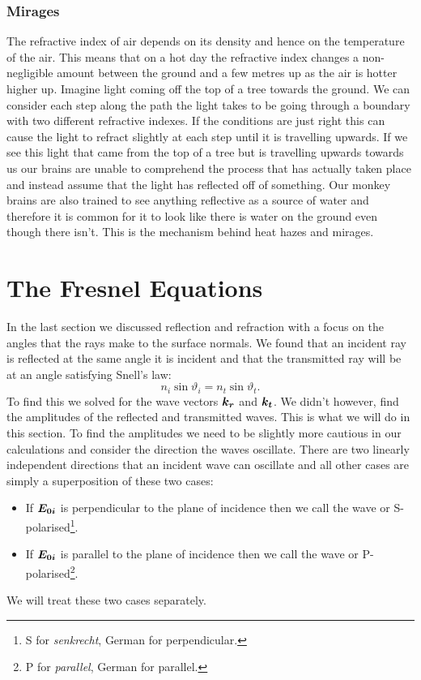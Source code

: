     \subsubsection{Mirages}
    The refractive index of air depends on its density and hence on the temperature of the air.
    This means that on a hot day the refractive index changes a non-negligible amount between the ground and a few metres up as the air is hotter higher up.
    Imagine light coming off the top of a tree towards the ground.
    We can consider each step along the path the light takes to be going through a boundary with two different refractive indexes.
    If the conditions are just right this can cause the light to refract slightly at each step until it is travelling upwards.
    If we see this light that came from the top of a tree but is travelling upwards towards us our brains are unable to comprehend the process that has actually taken place and instead assume that the light has reflected off of something.
    Our monkey brains are also trained to see anything reflective as a source of water and therefore it is common for it to look like there is water on the ground even though there isn't.
    This is the mechanism behind heat hazes and mirages.
    
    \section{The Fresnel Equations}
    In the last section we discussed reflection and refraction with a focus on the angles that the rays make to the surface normals.
    We found that an incident ray is reflected at the same angle it is incident and that the transmitted ray will be at an angle satisfying Snell's law:
    \[n_i\sin\vartheta_i = n_t\sin\vartheta_t.\]
    To find this we solved for the wave vectors \(\bm{k_r}\) and \(\bm{k_t}\).
    We didn't however, find the amplitudes of the reflected and transmitted waves.
    This is what we will do in this section.
    To find the amplitudes we need to be slightly more cautious in our calculations and consider the direction the waves oscillate.
    There are two linearly independent directions that an incident wave can oscillate and all other cases are simply a superposition of these two cases:
    \begin{itemize}
        \item If \(\bm{E_{0i}}\) is perpendicular to the plane of incidence then we call the wave  or S-polarised\footnote{S for \textit{senkrecht}, German for perpendicular.}.
        \item If \(\bm{E_{0i}}\) is parallel to the plane of incidence then we call the wave  or P-polarised\footnote{P for \textit{parallel}, German for parallel.}.
    \end{itemize}
    We will treat these two cases separately.
    
